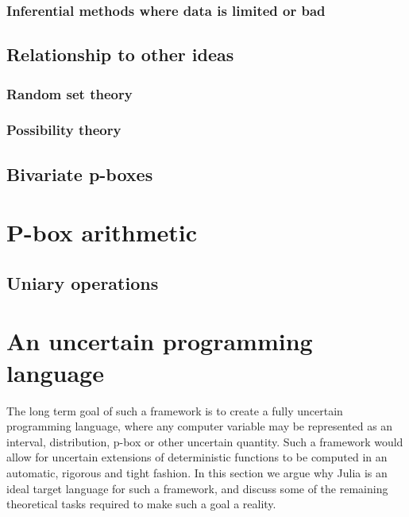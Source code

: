 \documentclass{juliacon}
\begin{document}
\subsubsection{Inferential methods where data is limited or bad} %


\subsection{Relationship to other ideas}

\subsubsection{Random set theory}

\subsubsection{Possibility theory}




\subsection{Bivariate p-boxes}


\section{P-box arithmetic}

\subsection{Uniary operations}



\section{An uncertain programming language}
\label{sec:additional_faci}

The long term goal of such a framework is to create a fully uncertain programming language, where any computer variable may be represented as an interval, distribution, p-box or other uncertain quantity. Such a framework would allow for uncertain extensions of deterministic functions to be computed in an automatic, rigorous and tight fashion. In this section we argue why Julia is an ideal target language for such a framework, and discuss some of the remaining theoretical tasks required to make such a goal a reality. 
\end{document}
